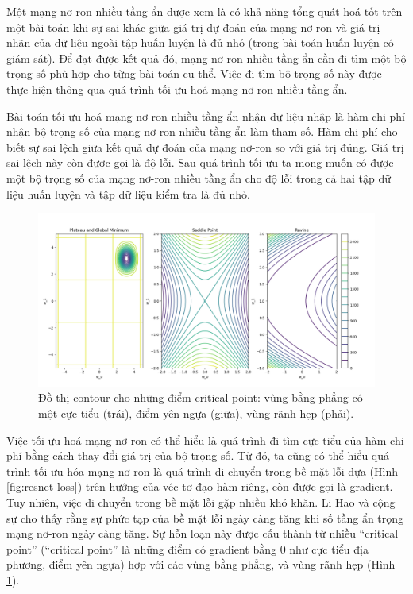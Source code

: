Một mạng nơ-ron nhiều tầng ẩn được xem là có khả năng tổng quát hoá tốt trên một bài toán khi sự sai khác giữa giá trị dự đoán của mạng nơ-ron và giá trị nhãn của dữ liệu ngoài tập huấn luyện là đủ nhỏ (trong bài toán huấn luyện có giám sát). Để đạt được kết quả đó, mạng nơ-ron nhiều tầng ẩn cần đi tìm một bộ trọng số phù hợp cho từng bài toán cụ thể. Việc đi tìm bộ trọng số này được thực hiện thông qua quá trình tối ưu hoá mạng nơ-ron nhiều tầng ẩn.

Bài toán tối ưu hoá mạng nơ-ron nhiều tầng ẩn nhận dữ liệu nhập là hàm chi phí nhận bộ trọng số của mạng nơ-ron nhiều tầng ẩn làm tham số. Hàm chi phí cho biết sự sai lệch giữa kết quả dự đoán của mạng nơ-ron so với giá trị đúng. Giá trị sai lệch này còn được gọi là độ lỗi. Sau quá trình tối ưu ta mong muốn có được một bộ trọng số của mạng nơ-ron nhiều tầng ẩn cho độ lỗi trong cả hai tập dữ liệu huấn luyện và tập dữ liệu kiểm tra là đủ nhỏ.

\begin{figure}[htp]
	\centering
	\includegraphics[width=120 mm]{images/cricial-point-contour.png}
	\caption{Đồ thị contour cho những điểm critical point: vùng bằng phẳng có một cực tiểu (trái), điểm yên ngựa (giữa), vùng rãnh hẹp (phải).}
	\label{fig:cricial-point-contour}
\end{figure}

Việc tối ưu hoá mạng nơ-ron có thể hiểu là quá trình đi tìm cực tiểu của hàm chi phí bằng cách thay đổi giá trị của bộ trọng số. Từ đó, ta cũng có thể hiểu quá trình tối ưu hóa mạng nơ-ron là quá trình di chuyển trong bề mặt lỗi dựa (Hình \ref{fig:resnet-loss}) trên hướng của véc-tơ đạo hàm riêng, còn được gọi là gradient. Tuy nhiên, việc di chuyển trong bề mặt lỗi gặp nhiều khó khăn. Li Hao và cộng sự\cite{li2018visualizing} cho thấy rằng sự phức tạp của bề mặt lỗi ngày càng tăng khi số tầng ẩn trọng mạng nơ-ron ngày càng tăng. Sự hỗn loạn này được cấu thành từ nhiều ``critical point'' (``critical point'' là những điểm có gradient bằng 0 như cực tiểu địa phương, điểm yên ngựa) hợp với các vùng bằng phẳng, và vùng rãnh hẹp (Hình \ref{fig:cricial-point-contour}).

